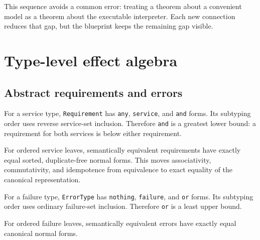 This sequence avoids a common error: treating a theorem about a convenient
model as a theorem about the executable interpreter. Each new connection
reduces that gap, but the blueprint keeps the remaining gap visible.

\chapter{Type-level effect algebra}

\section{Abstract requirements and errors}

\begin{definition}
\label{def:requirement-intersection}
\leanok
For a service type, \texttt{Requirement} has \texttt{any}, \texttt{service},
and \texttt{and} forms. Its subtyping order uses reverse service-set
inclusion. Therefore \texttt{and} is a greatest lower bound: a requirement
for both services is below either requirement.
\end{definition}

\begin{theorem}
\label{thm:requirement-normal-forms}
\leanok
For ordered service leaves, semantically equivalent requirements have exactly
equal sorted, duplicate-free normal forms. This moves associativity,
commutativity, and idempotence from equivalence to exact equality of the
canonical representation.
\end{theorem}

\begin{definition}
\label{def:error-union}
\leanok
For a failure type, \texttt{ErrorType} has \texttt{nothing}, \texttt{failure},
and \texttt{or} forms. Its subtyping order uses ordinary failure-set
inclusion. Therefore \texttt{or} is a least upper bound.
\end{definition}

\begin{theorem}
\label{thm:error-normal-forms}
\leanok
For ordered failure leaves, semantically equivalent errors have exactly equal
canonical normal forms.
\end{theorem}

